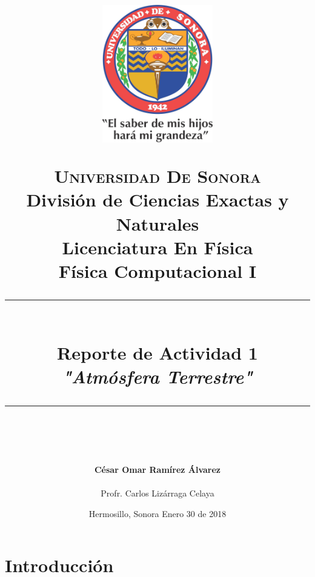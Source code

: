 \documentclass[12pt]{article}
\newcommand{\HRule}[1]{\rule{\linewidth}{#1}}
\begin{document}
\begin{titlepage}

\title{ \normalsize 
        \begin{center}
        \includegraphics[height=6cm]{Logo.jpg}
        \end{center}
        \LARGE \textsc{\textbf{Universidad De Sonora}} \\ \bigskip
		\Large División de Ciencias Exactas y Naturales \\
        Licenciatura En Física \\ \bigskip
        \bigskip
        Física Computacional I
		\\ [0.1cm]  
		\HRule{2pt} \\
		\Large \textbf{{Reporte de Actividad 1}} \\
        \textit{\textbf{"Atmósfera Terrestre"}}
		\HRule{2pt} \\
		\normalsize \vspace*{0.001\baselineskip}}
        
\date{\bigskip \Large Hermosillo, Sonora  \hspace*{\fill}  Enero 30 de 2018}

        
\author{
		\Large\textbf{ César Omar Ramírez Álvarez} \\ \bigskip
        \\ \bigskip
       \Large Profr. Carlos Lizárraga Celaya}
       \end{titlepage}
       \maketitle
       

\newpage
\pagestyle{plain}
\section{Introducción}
\end{document}
